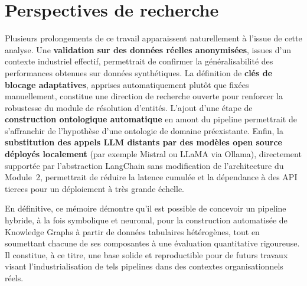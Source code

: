 \section*{Perspectives de recherche}

Plusieurs prolongements de ce travail apparaissent naturellement à
l'issue de cette analyse. Une \textbf{validation sur des données
réelles anonymisées}, issues d'un contexte industriel effectif,
permettrait de confirmer la généralisabilité des performances
obtenues sur données synthétiques. La définition de \textbf{clés de
blocage adaptatives}, apprises automatiquement plutôt que fixées
manuellement, constitue une direction de recherche ouverte pour
renforcer la robustesse du module de résolution d'entités. L'ajout
d'une étape de \textbf{construction ontologique automatique} en
amont du pipeline permettrait de s'affranchir de l'hypothèse d'une
ontologie de domaine préexistante. Enfin, la \textbf{substitution des
appels LLM distants par des modèles open source déployés localement}
(par exemple Mistral ou LLaMA via Ollama), directement supportée par
l'abstraction LangChain sans modification de l'architecture du
Module~2, permettrait de réduire la latence cumulée et la dépendance
à des API tierces pour un déploiement à très grande échelle.

En définitive, ce mémoire démontre qu'il est possible de concevoir
un pipeline hybride, à la fois symbolique et neuronal, pour la
construction automatisée de Knowledge Graphs à partir de données
tabulaires hétérogènes, tout en soumettant chacune de ses composantes
à une évaluation quantitative rigoureuse. Il constitue, à ce titre,
une base solide et reproductible pour de futurs travaux visant
l'industrialisation de tels pipelines dans des contextes
organisationnels réels.